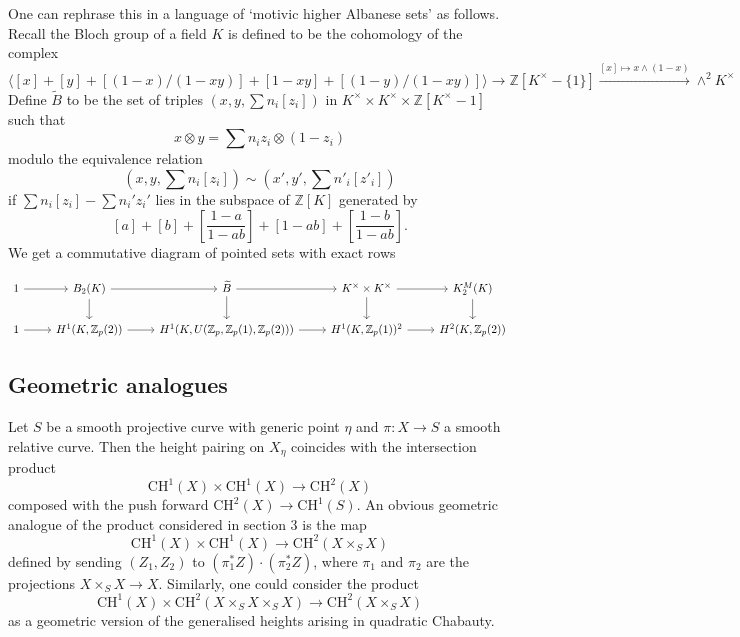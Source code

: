 \documentclass[11pt]{amsart}
\def\Z{\mathbb Z}
\theoremstyle{plain}
\theoremstyle{definition}
\newcommand{\CH}{\mathrm{CH}}
\begin{document}
One can rephrase this in a language of `motivic higher Albanese sets' as follows. Recall \cite{suslin} the Bloch group of a field $K$ is defined to be the cohomology of the complex
\[
\langle [x]+[y]+[(1-x)/(1-xy)]+[1-xy]+[(1-y)/(1-xy)] \rangle\to \Z [K^\times -\{ 1\} ] \stackrel{[x]\mapsto x\wedge (1-x)}{\longrightarrow} \wedge ^2 K^\times 
\]
 Define $\widetilde{B}$ to be the set of triples $(x,y,\sum n_i [z_i ])$ in $K^\times \times K^\times \times \Z [K^\times -1]$ such that
\[
x\otimes y =\sum n_i z_i \otimes (1-z_i )
\]
modulo the equivalence relation
\[
(x,y,\sum n_i [z_i ])\sim (x',y',\sum n' _i [z' _i ])
\]
if $\sum n_i [z_i ]-\sum n_i ' z_i '$ lies in the subspace of $\Z [K]$ generated by 
\[
[a]+[b]+[\frac{1-a}{1-ab}]+[1-ab]+[\frac{1-b}{1-ab}].
\]
We get a commutative diagram of pointed sets with exact rows
\begin{small}
\[
\begin{tikzcd}
1 \arrow[r] & B_2 (K) \arrow[d] \arrow[r] & \widetilde{B} \arrow[d] \arrow[r] & K^\times \times K^\times \arrow[d] \arrow[r] & K^M _2 (K) \arrow[d]  \\
1 \arrow[r] & H^1  (K,\Z _p (2)) \arrow[r]           & H^1  (K,U(\Z _p ,\Z _p (1),\Z _p (2))) \arrow[r]           & H^1  (K,\Z _p (1))^2 \arrow[r]           &     H^2 (K,\Z _p (2))        
\end{tikzcd}
\]
\end{small}
\subsection{Geometric analogues}\label{subsec:geom}
Let $S$ be a smooth projective curve with generic point $\eta $ and $\pi :X\to S$ a smooth relative curve. Then the height pairing on $X_{\eta }$ coincides with the intersection product
\[
\CH ^1 (X)\times \CH ^1 (X)\to \CH ^2 (X)
\]
composed with the push forward $\CH ^2 (X)\to \CH ^1 (S)$. An obvious geometric analogue of the product considered in section 3 is the map
\[
\CH^1 (X)\times \CH ^1 (X)\to \CH^2 (X\times _S X)
\]
defined by sending $(Z_1 ,Z_2 )$ to $(\pi _1 ^* Z )\cdot (\pi _2 ^* Z)$, where $\pi _1 $ and $\pi _2 $ are the projections $X\times _S X\to X$. Similarly, one could consider the product
\[
\CH ^1 (X)\times \CH ^2 (X\times _S X\times _S X)\to \CH ^2 (X\times _S X)
\]
as a geometric version of the generalised heights arising in quadratic Chabauty.
\end{document}
